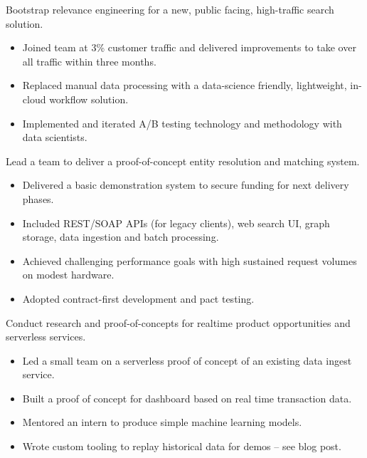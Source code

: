 \documentclass[11pt,a4paper,sans]{moderncv}        %
\begin{document}
{Bootstrap relevance engineering for a new, public facing, high-traffic search solution.
\newline{}
\begin{itemize}
\item Joined team at 3\% customer traffic and delivered improvements to take over all traffic within three months.
\item Replaced manual data processing with a data-science friendly, lightweight, in-cloud workflow solution.
\item Implemented and iterated A/B testing technology and methodology with data scientists.
\end{itemize}
}
{Lead a team to deliver a proof-of-concept entity resolution and matching system.
\newline{}
\begin{itemize}
\item Delivered a basic demonstration system to secure funding for next delivery phases.
\item Included REST/SOAP APIs (for legacy clients), web search UI, graph storage, data ingestion and batch processing.
\item Achieved challenging performance goals with high sustained request volumes on modest hardware.
\item Adopted contract-first development and pact testing.
\end{itemize}
}
{Conduct research and proof-of-concepts for realtime product opportunities and serverless services.
\newline{}
\begin{itemize}
\item Led a small team on a serverless proof of concept of an existing data ingest service.
\item Built a proof of concept for dashboard based on real time transaction data.
\item Mentored an intern to produce simple machine learning models.
\item Wrote custom tooling to replay historical data for demos – see blog post.
\end{itemize}
}
\end{document}
